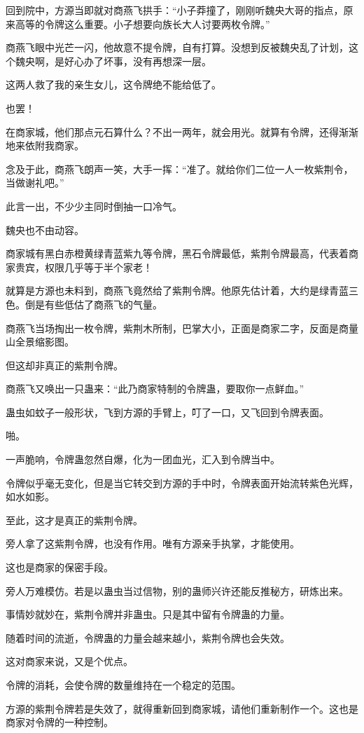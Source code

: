 \begin{this_body}
回到院中，方源当即就对商燕飞拱手：“小子莽撞了，刚刚听魏央大哥的指点，原来高等的令牌这么重要。小子想要向族长大人讨要两枚令牌。”

商燕飞眼中光芒一闪，他故意不提令牌，自有打算。没想到反被魏央乱了计划，这个魏央啊，是好心办了坏事，没有再想深一层。

这两人救了我的亲生女儿，这令牌绝不能给低了。

也罢！

在商家城，他们那点元石算什么？不出一两年，就会用光。就算有令牌，还得渐渐地来依附我商家。

念及于此，商燕飞朗声一笑，大手一挥：“准了。就给你们二位一人一枚紫荆令，当做谢礼吧。”

此言一出，不少少主同时倒抽一口冷气。

魏央也不由动容。

商家城有黑白赤橙黄绿青蓝紫九等令牌，黑石令牌最低，紫荆令牌最高，代表着商家贵宾，权限几乎等于半个家老！

就算是方源也未料到，商燕飞竟然给了紫荆令牌。他原先估计着，大约是绿青蓝三色。倒是有些低估了商燕飞的气量。

商燕飞当场掏出一枚令牌，紫荆木所制，巴掌大小，正面是商家二字，反面是商量山全景缩影图。

但这却非真正的紫荆令牌。

商燕飞又唤出一只蛊来：“此乃商家特制的令牌蛊，要取你一点鲜血。”

蛊虫如蚊子一般形状，飞到方源的手臂上，叮了一口，又飞回到令牌表面。

啪。

一声脆响，令牌蛊忽然自爆，化为一团血光，汇入到令牌当中。

令牌似乎毫无变化，但是当它转交到方源的手中时，令牌表面开始流转紫色光辉，如水如影。

至此，这才是真正的紫荆令牌。

旁人拿了这紫荆令牌，也没有作用。唯有方源亲手执掌，才能使用。

这也是商家的保密手段。

旁人万难模仿。若是以蛊虫当过信物，别的蛊师兴许还能反推秘方，研炼出来。

事情妙就妙在，紫荆令牌并非蛊虫。只是其中留有令牌蛊的力量。

随着时间的流逝，令牌蛊的力量会越来越小，紫荆令牌也会失效。

这对商家来说，又是个优点。

令牌的消耗，会使令牌的数量维持在一个稳定的范围。

方源的紫荆令牌若是失效了，就得重新回到商家城，请他们重新制作一个。这也是商家对令牌的一种控制。


\end{this_body}
